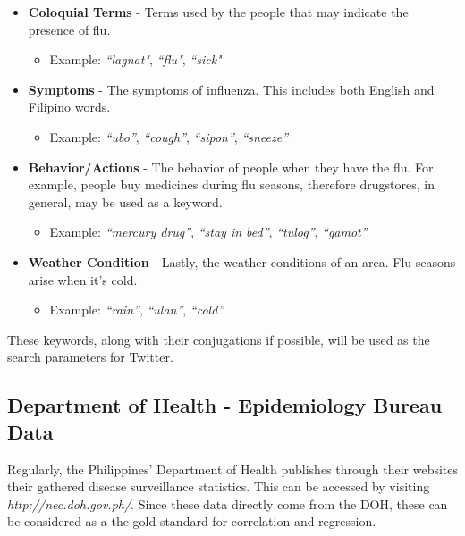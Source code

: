 \begin{itemize} 
\item \textbf{Coloquial Terms} - Terms used by the people that may indicate the presence of flu.
	\begin{itemize} 
		\item Example: \textit{``lagnat"}, \textit{``flu"}, \textit{``sick"}
	\end{itemize}
\item \textbf{Symptoms} - The symptoms of influenza. This includes both English and Filipino words.
	\begin{itemize} 
		\item Example: \textit{``ubo''}, \textit{``cough''}, \textit{``sipon''}, \textit{``sneeze''}
	\end{itemize}
\item \textbf{Behavior/Actions} - The behavior of people when they have the flu. For example, people  buy medicines during flu seasons, therefore drugstores, in general, may be used as a keyword.
	\begin{itemize} 
		\item Example: \textit{``mercury drug''}, \textit{``stay in bed''}, \textit{``tulog''}, \textit{``gamot''}
	\end{itemize}
\item \textbf{Weather Condition} - Lastly, the weather conditions of an area. Flu seasons arise when it's cold.
\begin{itemize} 
		\item Example: \textit{``rain''}, \textit{``ulan''}, \textit{``cold''}
	\end{itemize}
\end{itemize}

These keywords, along with their conjugations if possible, will be used as the search parameters for Twitter. 

\subsection{Department of Health - Epidemiology Bureau Data}

Regularly, the Philippines' Department of Health publishes through their websites their gathered disease surveillance statistics. This can be accessed by visiting \textit{http://nec.doh.gov.ph/}. Since these data directly come from the DOH, these can be considered as a the gold standard for correlation and regression.

